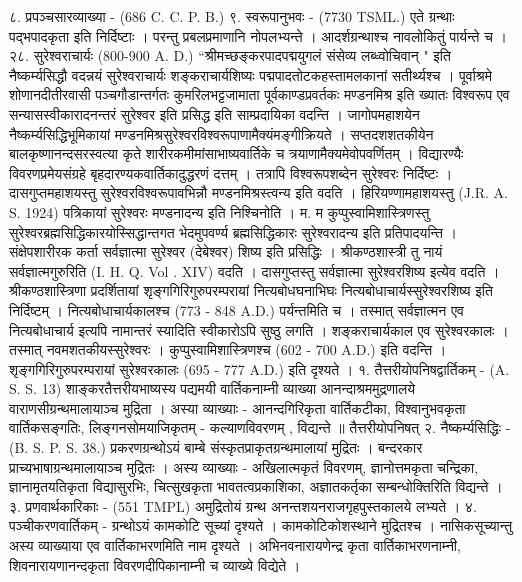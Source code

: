 ८. प्रपञ्चसारव्याख्या - (686 C. C. P. B.)
९. स्वरूपानुभवः - (7730 TSML.)
एते ग्रन्थाः पद्भपादकृता इति निर्दिष्टाः । परन्तु प्रबलप्रमाणानि नोपलभ्यन्ते । आदर्शग्रन्थाश्च नावलोकितुं पार्यन्ते च ।
२८. सुरेश्वराचार्यः (800-900 A. D.)
``श्रीमच्छङ्करपादपद्मयुगलं संसेव्य लब्ध्वोचिवान् " इति नैष्कर्म्यसिद्धौ वदन्नयं सुरेश्वराचार्यः शङ्कराचार्यशिष्यः पद्मपादतोटकहस्तामलकानां सतीर्थ्यश्च ।
पूर्वाश्रमे शोणानदीतीरवासी पञ्चगौडान्तर्गतः कुमरिलभट्टजामाता पूर्वकाण्डप्रवर्तकः मण्डनमिश्र इति ख्यातः विश्वरूप एव सन्यासस्वीकारादनन्तरं सुरेश्वर इति प्रसिद्ध इति साम्प्रदायिका वदन्ति । जागोपमहाशयेन नैष्कर्म्यसिद्धिभूमिकायां मण्डनमिश्रसुरेश्वरविश्वरूपाणामैक्यंमङ्गीक्रियते । सप्तदशशतकीयेन बालकृष्णानन्दसरस्वत्या कृते शारीरकमीमांसाभाष्यवार्तिके च त्रयाणामैक्यमेवोपवर्णितम् । विद्यारण्यैः विवरणप्रमेयसंग्रहे बृहदारण्यकवार्तिकादुद्धरणं दत्तम् । तत्रापि विश्वरूपशब्देन सुरेश्वरः निर्दिष्टः ।
दासगुप्तमहाशयस्तु सुरेश्वरविश्वरूपावभिन्नौ मण्डनमिश्रस्त्वन्य इति वदति । हिरियण्णामहाशयस्तु (J.R. A. S. 1924) पत्रिकायां सुरेश्वरः मण्डनादन्य इति निश्चिनोति । म. म कुप्पुस्वामिशास्त्रिणस्तु सुरेश्वरब्रह्मसिद्धिकारयोस्सिद्धान्तगत भेदमुपवर्ण्य ब्रह्मसिद्धिकारः सुरेश्वरादन्य इति प्रतिपादयन्ति । संक्षेपशारीरक कर्ता सर्वज्ञात्मा सुरेश्वर (देबेश्वर) शिष्य इति प्रसिद्धिः । श्रीकण्ठशास्त्री तु नायं सर्वज्ञात्मगुरुरिति (I. H. Q. Vol . XIV) वदति । दासगुप्तस्तु सर्वज्ञात्मा सुरेश्वरशिष्य इत्येव वदति । श्रीकण्ठशास्त्रिणा प्रदर्शितायां शृङ्गगिरिगुरुपरम्परायां नित्यबोधघनाभिघः नित्यबोधाचार्यस्सुरेश्वरशिष्य इति निर्दिष्टम् । नित्यबोधाचार्यकालश्च (773 - 848 A.D.) पर्यन्तमिति च । तस्मात् सर्वज्ञात्मन एव नित्यबोधाचार्य इत्यपि नामान्तरं स्यादिति स्वीकारोऽपि सुष्ठु लगति ।
शङ्कराचार्यकाल एव सुरेश्वरकालः । तस्मात् नवमशतकीयस्सुरेश्वरः । कुप्पुस्वामिशास्त्रिणश्च  (602 - 700 A.D.) इति वदन्ति । शृङ्गगिरिगुरुपरम्परायां सुरेश्वरकालः (695 - 777 A.D.) इति दृश्यते ।
१. तैत्तरीयोपनिषद्वार्तिकम् - (A. S. S. 13)
शाङ्करतैत्तरीयभाष्यस्य पद्यमयी वार्तिकनाम्नी व्याख्या आनन्दाश्रममुद्रणालये वाराणसीग्रन्थमालायाञ्च मुद्रिता । अस्या व्याख्याः - आनन्दगिरिकृता वार्तिकटीका, विश्वानुभवकृता वार्तिकसङ्गतिः, लिङ्गनसोमयाजिकृतम् - कल्याणविवरणम् , विद्यन्ते ॥
तैत्तरीयोपनिषत्
२. नैष्कर्म्यसिद्धिः - (B. S. P. S. 38.)
प्रकरणग्रन्थोऽयं बाम्बे संस्कृतप्राकृतग्रन्थमालायां मुद्रितः । बन्दरकार प्राच्यभाषाग्रन्थमालायाञ्च मुद्रितः । अस्य व्याख्याः - अखिलात्मकृतं विवरणम्, ज्ञानोत्तमकृता चन्द्रिका, ज्ञानामृतयतिकृता विद्यासुरभिः, चित्सुखकृता भावतत्वप्रकाशिका, अज्ञातकर्तृका सम्बन्धोक्तिरिति विद्यन्ते ।
३. प्रणवार्थकारिकाः - (551 TMPL)
अमुद्रितोयं ग्रन्थ अनन्तशयनराजगृहपुस्तकालये लभ्यते ।
४. पञ्चीकरणवार्तिकम् -
ग्रन्थोऽयं कामकोटि सूच्यां दृश्यते । कामकोटिकोशस्थाने मुद्रितश्च । नासिकसूच्यान्तु अस्य व्याख्याया एव वार्तिकाभरणमिति नाम दृश्यते । अभिनवनारायणेन्द्र कृता वार्तिकाभरणनाम्नी, शिवनारायणानन्दकृता विवरणदीपिकानाम्नी च व्याख्ये विद्येते ।
